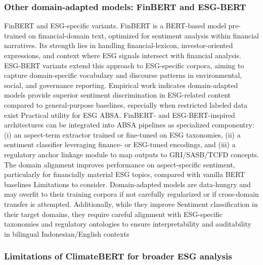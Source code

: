 \subsubsection{Other domain-adapted models: FinBERT and ESG-BERT}

FinBERT and ESG-specific variants. FinBERT is a BERT-based model pre-trained on financial-domain text, optimized for sentiment analysis within financial narratives. Its strength lies in handling financial-lexicon, investor-oriented expressions, and context where ESG signals intersect with financial analysis. ESG-BERT variants extend this approach to ESG-specific corpora, aiming to capture domain-specific vocabulary and discourse patterns in environmental, social, and governance reporting. Empirical work indicates domain-adapted models provide superior sentiment discrimination in ESG-related content compared to general-purpose baselines, especially when restricted labeled data exist \cite{10.21608/msaeng.2023.291899,10.3390/math12193119}
Practical utility for ESG ABSA. FinBERT- and ESG-BERT-inspired architectures can be integrated into ABSA pipelines as specialized componentry: (i) an aspect-term extractor trained or fine-tuned on ESG taxonomies, (ii) a sentiment classifier leveraging finance- or ESG-tuned encodings, and (iii) a regulatory anchor linkage module to map outputs to GRI/SASB/TCFD concepts. The domain alignment improves performance on aspect-specific sentiment, particularly for financially material ESG topics, compared with vanilla BERT baselines \cite{10.21608/msaeng.2023.291899,10.3390/math12193119}
Limitations to consider. Domain-adapted models are data-hungry and may overfit to their training corpora if not carefully regularized or if cross-domain transfer is attempted. Additionally, while they improve Sentiment classification in their target domains, they require careful alignment with ESG-specific taxonomies and regulatory ontologies to ensure interpretability and auditability in bilingual Indonesian/English contexts \cite{10.1177/09726225241237304,10.1111/ejed.70225,10.1145/3503044}
\subsubsection{Limitations of ClimateBERT for broader ESG analysis}

